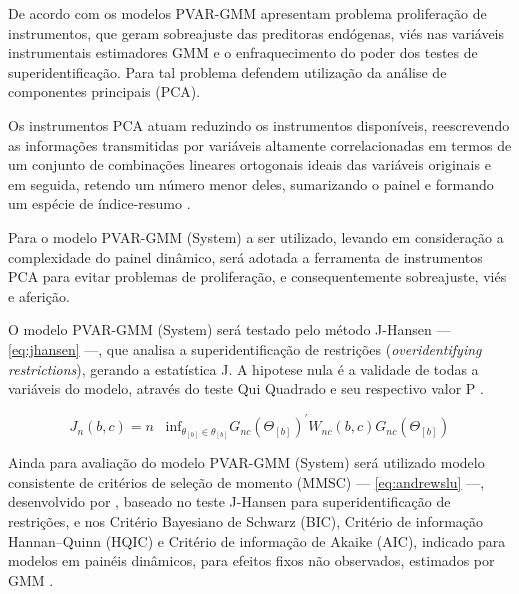 \documentclass[
  12pt,
  12pt,
  openright,
  oneside,
  a4paper,
  chapter=TITLE,
  section=TITLE,
  subsection=TITLE,
  subsubsection=TITLE,
  english,
  portugues,
  sumario=tradicional]{abntex2}
\begin{document}
De acordo com \textcite{bontempi:2015} os modelos PVAR-GMM apresentam problema proliferação de instrumentos, que geram sobreajuste das preditoras endógenas, viés nas variáveis instrumentais estimadores GMM e o enfraquecimento do poder dos testes de superidentificação. Para tal problema \textcite{bontempi:2015} defendem utilização da análise de componentes principais (PCA).

Os instrumentos PCA atuam reduzindo os instrumentos disponíveis, reescrevendo as informações transmitidas por variáveis altamente correlacionadas em termos de um conjunto de combinações lineares ortogonais ideais das variáveis originais e em seguida, retendo um número menor deles, sumarizando o painel e formando um espécie de índice-resumo \cite{bontempi:2015}.

Para o modelo PVAR-GMM (System) a ser utilizado, levando em consideração a complexidade do painel dinâmico, será adotada a ferramenta de instrumentos PCA para evitar problemas de proliferação, e consequentemente sobreajuste, viés e aferição.

O modelo PVAR-GMM (System) será testado pelo método J-Hansen --- \autoref{eq:jhansen} ---, que analisa a superidentificação de restrições (\emph{overidentifying restrictions}), gerando a estatística J. A hipotese nula é a validade de todas a variáveis do modelo, através do teste Qui Quadrado e seu respectivo valor P \cite{andrews-lu:2001,sigmund:2008}.

\begin{equation}\label{eq:jhansen}
J_{n}(b,c) = n \hspace{10pt} \text{inf}_{\theta_{[b]} \in \theta_{[b]}} G_{nc} (\Theta_{[b]})^{'}W_{nc}(b,c)G_{nc}(\Theta_{[b]}) 
\end{equation}

Ainda para avaliação do modelo PVAR-GMM (System) será utilizado modelo consistente de critérios de seleção de momento (MMSC) --- \autoref{eq:andrewslu} ---, desenvolvido por \textcite{andrews-lu:2001}, baseado no teste J-Hansen para superidentificação de restrições, e nos Critério Bayesiano de Schwarz (BIC), Critério de informação Hannan--Quinn (HQIC) e Critério de informação de Akaike (AIC), indicado para modelos em painéis dinâmicos, para efeitos fixos não observados, estimados por GMM \cite{sigmund:2008, zivotwang:2003}.
\end{document}
